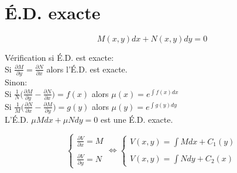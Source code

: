 \section{É.D. exacte}
\[M(x,y)dx+N(x,y)dy=0\]
\raggedright
Vérification si É.D. est exacte:\\\vspace{5pt}
Si $\frac{\partial M}{\partial y}=\frac{\partial N}{\partial x}$ alors l'É.D. est exacte.
\\\vspace{5pt}
Sinon:\\\vspace{5pt}
Si $\frac{1}{N}\bigg(\frac{\partial M}{\partial y}-\frac{\partial N}{\partial x}\bigg)=f(x)$ alors $\mu(x)=e^{\int f(x)dx}$\\\vspace{5pt}
 Si $\frac{1}{M}\bigg(\frac{\partial N}{\partial x}-\frac{\partial M}{\partial y}\bigg)=g(y)$ alors $\mu(y)=e^{\int g(y)dy}$\\\vspace{5pt}
L'É.D. $\mu M dx+\mu Ndy=0 $ est une É.D. exacte.


\[\left \{\begin{matrix} \frac{\partial V}{\partial x}=M\\\\ \frac{\partial V}{\partial y}=N \end{matrix}\right.\Leftrightarrow 
\left \{\begin{matrix} V(x,y)=\int Mdx+C_1(y)\\\\ V(x,y)=\int Ndy+C_2(x) \end{matrix}\right.\]